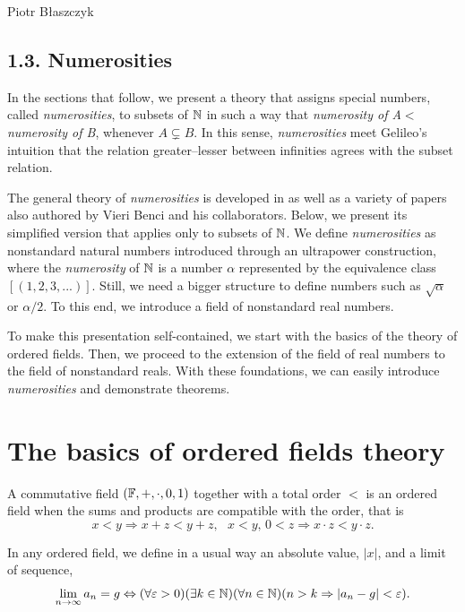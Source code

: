 \begin{artengenv}{Piotr Błaszczyk}
\subsection{1.3. Numerosities}
In  the sections that follow, we present a theory that assigns  special numbers, called \textit{numerosities}, to subsets of ${\mathbb{N}}$ in  such a way that \textit{numerosity of A}$<$\textit{numerosity of B}, whenever $A\subsetneq B$. In this sense, \textit{numerosities} meet Gelileo's intuition that the relation greater--lesser between infinities agrees with the subset relation. 

The general theory of \textit{numerosities} is developed in \parencite{ref_BN19} as well as a variety of papers also authored by Vieri Benci and his collaborators. Below, we present its simplified version that applies only to subsets of ${\mathbb{N}}$. We define \textit{numerosities} as nonstandard natural numbers introduced through an ultrapower construction, where the \textit{numerosity} of ${\mathbb{N}}$ is a number $\alpha$ represented by the equivalence class $[(1,2,3,...)]$. 
Still, we need a bigger structure  to define numbers such as $\sqrt \alpha$ or $\alpha/2$. To this end, we introduce a field of nonstandard real numbers.

  To make this presentation self-contained, we start with the basics of the theory of ordered fields. Then, we proceed to the extension of the field of real numbers to the field of nonstandard reals. With these foundations, we can easily introduce \textit{numerosities} and demonstrate  theorems. 




\section{The basics of ordered fields theory}


A commutative field $({\mathbb{F}},+,\cdot,0,1)$ together with a total order $<$ is an ordered field when the sums and products are compatible with the order, that is
\[x<y \Rightarrow x+z<y+z,\ \ \ x<y,\, 0<z\Rightarrow x\cdot z<y\cdot z.\]

In any ordered field, we  define in a usual way an absolute value, $|x|$,  and a limit of  sequence,  
\[\lim\limits_{n\rightarrow\infty}a_n=g  \Leftrightarrow (\forall \varepsilon >0)(\exists k\in{\mathbb{N}})(\forall n\in{\mathbb{N}})(n>k \Rightarrow |a_n-g|<\varepsilon).\]



\end{artengenv}
